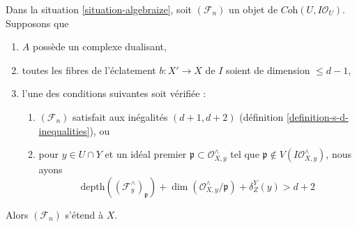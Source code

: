 \begin{lemma}
\label{lemma-blowup}
Dans la situation \ref{situation-algebraize}, soit $(\mathcal{F}_n)$
un objet de $\textit{Coh}(U, I\mathcal{O}_U)$. Supposons que
\begin{enumerate}
\item $A$ possède un complexe dualisant,
\item toutes les fibres de l'éclatement $b : X' \to X$ de $I$
soient de dimension $\leq d - 1$,
\item l'une des conditions suivantes soit vérifiée :
\begin{enumerate}
\item $(\mathcal{F}_n)$ satisfait aux inégalités $(d + 1, d + 2)$
(définition \ref{definition-s-d-inequalities}), ou
\item pour $y \in U \cap Y$ et un idéal premier
$\mathfrak p \subset \mathcal{O}_{X, y}^\wedge$ tel que
$\mathfrak p \not \in V(I\mathcal{O}_{X, y}^\wedge)$,
nous ayons
$$
\text{depth}((\mathcal{F}^\wedge_y)_\mathfrak p) +
\dim(\mathcal{O}_{X, y}^\wedge/\mathfrak p) + \delta^Y_Z(y) > d + 2
$$
\end{enumerate}
\end{enumerate}
Alors $(\mathcal{F}_n)$ s'étend à $X$.
\end{lemma}

